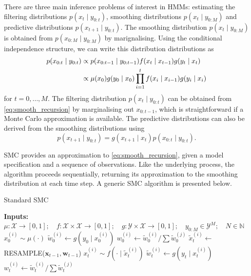 \documentclass{article}
\begin{document}
There are three main inference problems of interest in HMMs: estimating the filtering distributions $p(x_t \mid y_{0:t})$, smoothing distributions $p(x_{t} \mid y_{0:M})$ and predictive distributions $p(x_{t+1} \mid y_{0:t})$. 
The smoothing distribution $p(x_{t} \mid y_{0:M})$ is obtained from $p(x_{0:M} \mid y_{0:M})$ by marignalising. Using the conditional independence structure, we can write this distribution distributions as
\begin{align}
p(x_{0:t} \mid y_{0:t}) &\propto p(x_{0:t-1}\mid y_{0:t-1}) f(x_t\mid x_{t-1}) g(y_t \mid x_t) \label{eq:smooth_recursion}\\
&\propto \mu(x_0) g(y_0\mid x_0) \prod_{i=1}^t f(x_i \mid x_{i-1}) g(y_i\mid x_i) \notag
\end{align}
for $t = 0,\dots,M$. The filtering distribution $p(x_t \mid y_{0:t})$ can be obtained from \eqref{eq:smooth_recursion} by marginalising out $x_{0:t-1}$, which is straightforward if a Monte Carlo approximation is available.
The predictive distributions can also be derived from the smoothing distributions using
\begin{equation*}
p(x_{t+1}\mid y_{0:t}) = g(x_{t+1} \mid x_t) p(x_{0:t} \mid y_{0:t}).
\end{equation*}

SMC provides an approximation to \eqref{eq:smooth_recursion}, given a model specification and a sequence of observations. Like the underlying process, the algorithm proceeds sequentially, returning its approximation to the smoothing distribution at each time step.
A generic SMC algorithm is presented below.
\begin{algorithm}
	\caption{Standard SMC}\label{alg:SMC}
	\begin{algorithmic}[0]
    	\State \textbf{Inputs:} $\mu:\mathcal{X}\to[0,1];\quad f:\mathcal{X}\times\mathcal{X}\to[0,1];\quad g:\mathcal{Y}\times\mathcal{X}\to[0,1];\quad y_{0:M}\in\mathcal{Y}^M;\quad N\in\mathbb{N}$
			\State $x_0^{(i)} \sim \mu(\cdot)$
			\State $\tilde{w}_0^{(i)} \gets g(y_0 \mid x_0^{(i)})$
			\State $w_0^{(i)} \gets \tilde{w}_0^{(i)} / \sum \tilde{w}_0^{(j)}$
		\EndFor
        		\State $\tilde{x}_t^{(i)} \gets$ {\footnotesize RESAMPLE}($\mathbf{x}_{t-1}, \mathbf{w}_{t-1}$)
				\State $x_t^{(i)} \sim f(\cdot \mid \tilde{x}_t^{(i)})$
				\State $\tilde{w}_t^{(i)} \gets g(y_t \mid x_t^{(i)})$
				\State $w_t^{(i)} \gets \tilde{w}_t^{(i)} / \sum \tilde{w}_t^{(j)}$
        	\EndFor
        \EndFor
	\end{algorithmic}
\end{algorithm}
\end{document}
